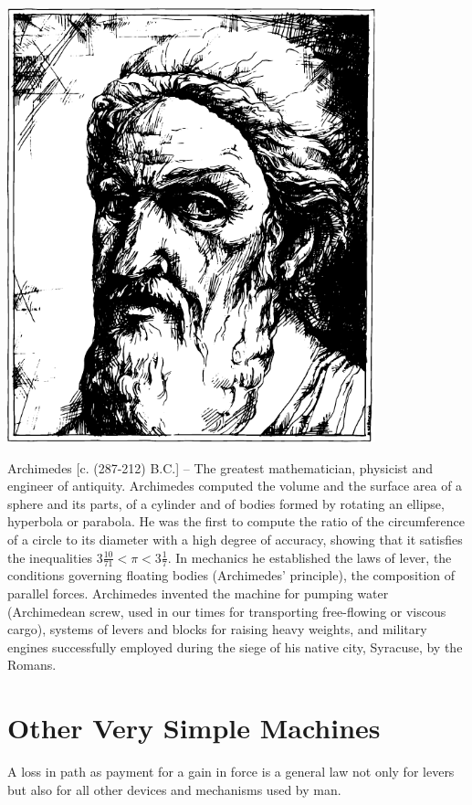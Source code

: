 \begin{center}
\includegraphics[width=0.8\textwidth]{figures/archimedes.pdf}
\end{center}

{\small \textsf{{Archimedes [c. (287-212) B.C.]}} -- \textsf{\footnotesize The greatest mathematician,
physicist and engineer of antiquity. Archimedes computed the
volume and the surface area of a sphere and its parts, of a
cylinder and of bodies formed by rotating an ellipse, hyperbola
or parabola. He was the first to compute the ratio of the circumference of a circle to its diameter with a high degree of accuracy, showing that it satisfies the inequalities $3 \frac{10}{71} < \pi < 3 \frac{1}{7}$. In mechanics he established the laws of lever, the conditions governing floating bodies (Archimedes' principle), the composition of parallel forces. Archimedes invented the machine for pumping water (Archimedean screw, used in our times for transporting free-flowing or viscous cargo), systems of levers and blocks for raising heavy weights, and military engines successfully employed during the siege of his native city, Syracuse, by the Romans.}}

\section{Other Very Simple Machines}

A loss in path as payment for a gain in force is a general law not only for levers but also for all other devices
and mechanisms used by man.

